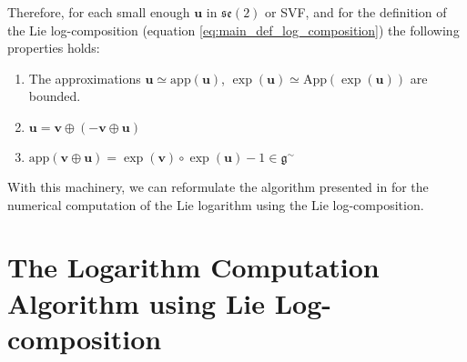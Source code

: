 \noindent
Therefore, for each small enough $\mathbf{u}$ in $\mathfrak{se}(2)$ or SVF, 
and for the definition of the Lie log-composition (equation \ref{eq:main_def_log_composition}) 
the following properties holds:
\begin{enumerate}
	\item The approximations $\mathbf{u} \simeq   \text{app} (\mathbf{u})$, $\exp(\mathbf{u}) \simeq   \text{App} (\exp(\mathbf{u})) $ are bounded.
	\item $\mathbf{u} = \mathbf{v} \oplus (-\mathbf{v} \oplus  \mathbf{u} )$
	\item $\text{app} (\mathbf{v} \oplus  \mathbf{u}) = \exp(\mathbf{v})\circ\exp(\mathbf{u}) - 1 \in \mathfrak{g} ^{\sim}$
\end{enumerate}

\noindent
With this machinery, we can reformulate the algorithm presented in \cite{Bossa:08} for the numerical computation of the Lie logarithm using the Lie log-composition.

\section{The Logarithm Computation Algorithm using Lie Log-composition}

